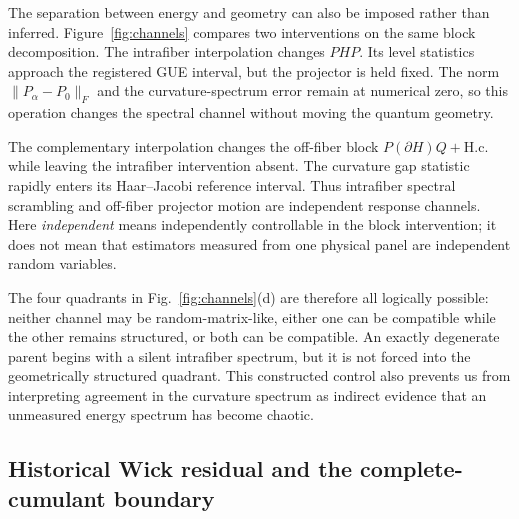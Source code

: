 The separation between energy and geometry can also be imposed rather than
inferred.  Figure~\ref{fig:channels} compares two interventions on the same
block decomposition.  The intrafiber interpolation changes $PHP$.  Its level
statistics approach the registered GUE interval, but the projector is held
fixed.  The norm $\lVert P_\alpha-P_0\rVert_F$ and the curvature-spectrum
error remain at numerical zero, so this operation changes the spectral
channel without moving the quantum geometry.

The complementary interpolation changes the off-fiber block
$P(\partial H)Q+\mathrm{H.c.}$ while leaving the intrafiber intervention
absent.  The curvature gap statistic rapidly enters its Haar--Jacobi
reference interval.  Thus intrafiber spectral scrambling and off-fiber
projector motion are independent response channels.  Here
\emph{independent} means independently controllable in the block
intervention; it does not mean that estimators measured from one physical
panel are independent random variables.

The four quadrants in Fig.~\ref{fig:channels}(d) are therefore all logically
possible: neither channel may be random-matrix-like, either one can be
compatible while the other remains structured, or both can be compatible.
An exactly degenerate parent begins with a silent intrafiber spectrum, but it
is not forced into the geometrically structured quadrant.  This constructed
control also prevents us from interpreting agreement in the curvature
spectrum as indirect evidence that an unmeasured energy spectrum has become
chaotic.

\subsection{Historical Wick residual and the complete-cumulant boundary}

